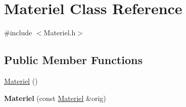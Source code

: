 \hypertarget{classMateriel}{\section{Materiel Class Reference}
\label{classMateriel}
}


{\ttfamily \#include $<$Materiel.\-h$>$}

\subsection*{Public Member Functions}
\begin{DoxyCompactItemize}
\item 
\hyperlink{classMateriel_a0ddcbd4ce36253c1a698512571c0e070}{Materiel} ()
\item 
\hypertarget{classMateriel_ad95cee4ed27a06addace4e4c8ed2c245}{{\bfseries Materiel} (const \hyperlink{classMateriel}{Materiel} \&orig)}\label{classMateriel_ad95cee4ed27a06addace4e4c8ed2c245}


\end{DoxyCompactItemize}
